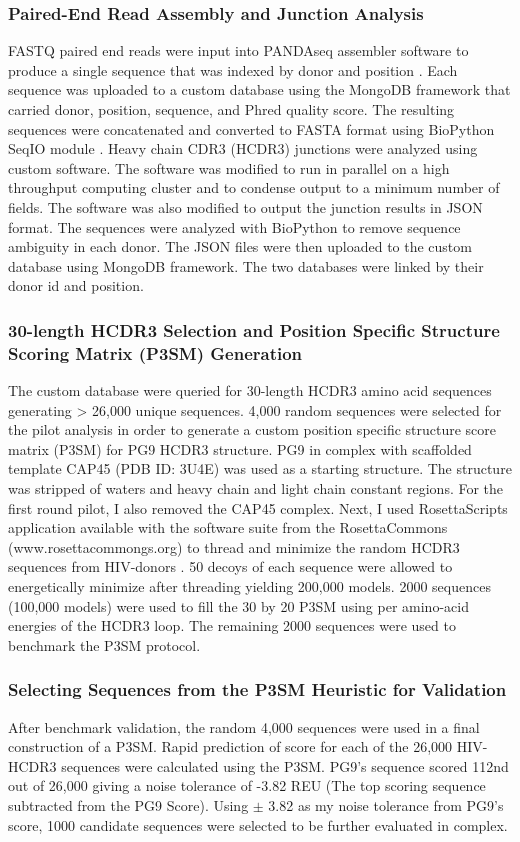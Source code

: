 \subsubsection{Paired-End Read Assembly and Junction Analysis}
FASTQ paired end reads were input into PANDAseq assembler software to produce a single sequence that was indexed by donor and position \citep{Bartram:2011cz}. Each sequence was uploaded to a custom database using the MongoDB framework that carried donor, position, sequence, and Phred quality score. The resulting sequences were concatenated and converted to FASTA format using BioPython SeqIO module \citep{Cock:2009hj}. Heavy chain CDR3 (HCDR3) junctions were analyzed using custom software. The software was modified to run in parallel on a high throughput computing cluster and to condense output to a minimum number of fields. The software was also modified to output the junction results in JSON format. The sequences were analyzed with BioPython to remove sequence ambiguity in each donor. The JSON files were then uploaded to the custom database using MongoDB framework. The two databases were linked by their donor id and position.

\subsubsection{30-length HCDR3 Selection and Position Specific Structure Scoring Matrix (P3SM) Generation}
The custom database were queried for 30-length HCDR3 amino acid sequences generating > 26,000 unique sequences. 4,000 random sequences were selected for the pilot analysis in order to generate a custom position specific structure score matrix (P3SM) for PG9 HCDR3 structure. PG9 in complex with scaffolded template CAP45 (PDB ID: 3U4E) was used as a starting structure. The structure was stripped of waters and heavy chain and light chain constant regions. For the first round pilot, I also removed the CAP45 complex. Next, I used RosettaScripts application available with the software suite from the RosettaCommons (www.rosettacommongs.org) to thread and minimize the random HCDR3 sequences from HIV-\naive donors \citep{Fleishman:2011ji}. 50 decoys of each sequence were allowed to energetically minimize after threading yielding 200,000 models. 2000 sequences (100,000 models) were used to fill the 30 by 20 P3SM using \rosetta per amino-acid energies of the HCDR3 loop. The remaining 2000 sequences were used to benchmark the P3SM protocol.

\subsubsection{Selecting Sequences from the P3SM Heuristic for Validation}
After benchmark validation, the random 4,000 sequences were used in a final construction of a P3SM. Rapid prediction of score for each of the 26,000 HIV-\naive HCDR3 sequences were calculated using the P3SM. PG9's sequence scored 112nd out of 26,000 giving a noise tolerance of -3.82 REU (The top scoring sequence subtracted from the PG9 Score). Using $\pm$ 3.82 as my noise tolerance from PG9's score, 1000 candidate sequences were selected to be further evaluated in complex.

